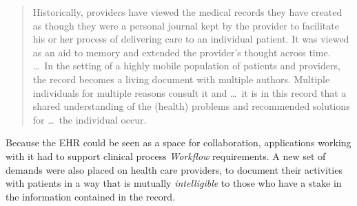\begin{quote}
    Historically, providers have viewed the medical records they have created
    as though they were a personal journal kept by the provider to facilitate
    his or her process of delivering care to an individual patient. It was
    viewed as an aid to memory and extended the provider's thought across time.
    \ldots\ In the setting of a highly mobile population of patients and
    providers, the record becomes a living document with multiple authors.
    Multiple individuals for multiple reasons consult it and \ldots\ it is in
    this record that a shared understanding of the (health) problems and
    recommended solutions for \ldots\ the individual occur.
\end{quote}

Because the EHR could be seen as a space for collaboration, applications
working with it had to support clinical process \emph{Workflow} requirements. A
new set of demands were also placed on health care providers, to document their
activities with patients in a way that is mutually \emph{intelligible} to those
who have a stake in the information contained in the record.
